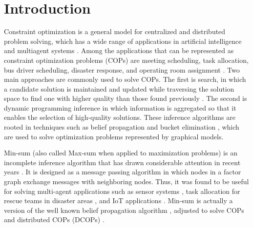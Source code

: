 \documentclass[letterpaper]{article} %
\theoremstyle{definition}
\theoremstyle{remark}
\begin{document}

\section{Introduction}\label{sec:intro}
Constraint optimization is a general model for centralized and distributed problem solving, which has a wide range of applications in artificial intelligence and multiagent systems \cite{YedidsionZF18,BoothB19,GolestanianBTB23}.
Among the applications that can be represented as constraint optimization problems (COPs) are meeting scheduling, task allocation, bus driver scheduling, disaster response, and operating room assignment \cite{csplib,NelkeOZ20,LavieCLZ23,GaonSZ23}.
Two main approaches are commonly used to solve COPs. The first is search, in which a candidate solution is maintained and updated while traversing the solution space to find one with higher quality than those found previously \cite{ModiSTY05,Zivan08,YeohFK10,LeeMS15}.
	The second is dynamic programming inference \cite{PetcuF05,RogersFSJ11,CohenGZ20} in which information is aggregated so that it enables the selection of high-quality solutions. These inference algorithms are rooted in techniques such as belief propagation and bucket elimination \cite{Pearl88,Dechter99}, which are used to solve optimization problems represented by graphical models.

	Min-sum (also called Max-sum when applied to maximization problems) is an incomplete inference algorithm that has drawn considerable attention in recent years \cite{FarinelliRPJ08,YuCHD17,CerquidesEPR18,DengA20}. It is designed as a message passing algorithm in which nodes in a factor graph exchange messages with neighboring nodes. Thus, it was found to be useful for solving multi-agent applications such as sensor systems \cite{TeacyFGPRJ08,StrandersFRJ09,YedidsionZF18}, task allocation for rescue teams in disaster areas \cite{RamchurnFMJ10}, and IoT applications \cite{RustPR16}.  Min-sum is actually a version of the well known belief propagation algorithm \cite{Pearl88,YanoverMW06}, adjusted to solve COPs and distributed COPs (DCOPs) \cite{BritoM10,GhoshKV15,KhanTYJ18,CohenLZ23}.
\end{document}
